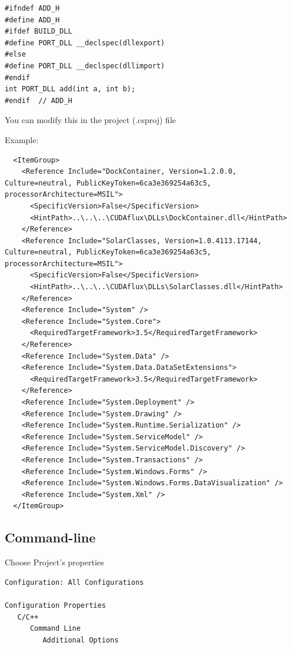 \begin{enumerate}
\begin{enumerate}
\begin{verbatim}
#ifndef ADD_H
#define ADD_H
#ifdef BUILD_DLL
#define PORT_DLL __declspec(dllexport)
#else
#define PORT_DLL __declspec(dllimport)
#endif
int PORT_DLL add(int a, int b);
#endif  // ADD_H
\end{verbatim}
 
 
 \end{enumerate}
 
 

\end{enumerate}


You can modify this in the project (.csproj) file

Example: 
\begin{verbatim}
  <ItemGroup>
    <Reference Include="DockContainer, Version=1.2.0.0, Culture=neutral, PublicKeyToken=6ca3e369254a63c5, processorArchitecture=MSIL">
      <SpecificVersion>False</SpecificVersion>
      <HintPath>..\..\..\CUDAflux\DLLs\DockContainer.dll</HintPath>
    </Reference>
    <Reference Include="SolarClasses, Version=1.0.4113.17144, Culture=neutral, PublicKeyToken=6ca3e369254a63c5, processorArchitecture=MSIL">
      <SpecificVersion>False</SpecificVersion>
      <HintPath>..\..\..\CUDAflux\DLLs\SolarClasses.dll</HintPath>
    </Reference>
    <Reference Include="System" />
    <Reference Include="System.Core">
      <RequiredTargetFramework>3.5</RequiredTargetFramework>
    </Reference>
    <Reference Include="System.Data" />
    <Reference Include="System.Data.DataSetExtensions">
      <RequiredTargetFramework>3.5</RequiredTargetFramework>
    </Reference>
    <Reference Include="System.Deployment" />
    <Reference Include="System.Drawing" />
    <Reference Include="System.Runtime.Serialization" />
    <Reference Include="System.ServiceModel" />
    <Reference Include="System.ServiceModel.Discovery" />
    <Reference Include="System.Transactions" />
    <Reference Include="System.Windows.Forms" />
    <Reference Include="System.Windows.Forms.DataVisualization" />
    <Reference Include="System.Xml" />
  </ItemGroup>
\end{verbatim}

\subsection{Command-line}
\label{sec:VS_Configuration_Properties_command-line}

Choose Project's properties
\begin{verbatim}
Configuration: All Configurations

Configuration Properties
   C/C++
      Command Line
         Additional Options
\end{verbatim}


